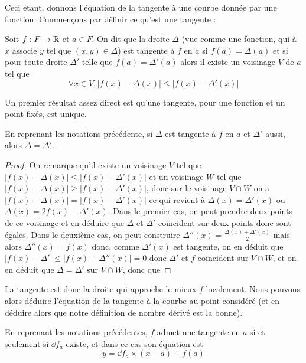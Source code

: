  Ceci étant, donnons l'équation de la tangente à une courbe donnée par une fonction. Commençons par définir ce qu'est une tangente :

 \begin{defi}
     Soit $f : F \to \mathbb{R}$ et $a\in F$. On dit que la droite $\Delta$ (vue comme une fonction, qui à $x$ associe $y$ tel que $(x,y)\in \Delta$) est tangente à $f$ en $a$ si $f(a)=\Delta(a)$ et si pour toute droite $\Delta'$ telle que $f(a)=\Delta'(a)$ alors il existe un voisinage $V$ de $a$ tel que $$\forall x\in V, |f(x)-\Delta(x)| \leq |f(x)-\Delta'(x)|$$
 \end{defi}

 Un premier résultat assez direct est qu'une tangente, pour une fonction et un point fixés, est unique.

 \begin{prop}
     En reprenant les notations précédente, si $\Delta$ est tangente à $f$ en $a$ et $\Delta'$ aussi, alors $\Delta = \Delta'$.
 \end{prop}

 \begin{proof}
     On remarque qu'il existe un voisinage $V$ tel que $|f(x)-\Delta(x)| \leq |f(x)-\Delta'(x)|$ et un voisinage $W$ tel que $|f(x)-\Delta(x)| \geq |f(x)-\Delta'(x)|$, donc sur le voisinage $V\cap W$ on a $|f(x) -\Delta(x)| = |f(x)-\Delta'(x)|$ ce qui revient à $\Delta(x) = \Delta'(x)$ ou $\Delta(x) = 2f(x)-\Delta'(x)$. Dans le premier cas, on peut prendre deux points de ce voisinage et en déduire que $\Delta$ et $\Delta'$ coïncident sur deux points donc sont égales. Dans le deuxième cas, on peut construire $\Delta''(x) = \displaystyle{\frac{\Delta(x)+\Delta'(x)}{2}}$ mais alors $\Delta''(x) = f(x)$ donc, comme $\Delta'(x)$ est tangente, on en déduit que $|f(x)-\Delta'| \leq |f(x)-\Delta''(x)|=0$ donc $\Delta'$ et $f$ coïncident sur $V\cap W$, et on en déduit que $\Delta = \Delta'$ sur $V\cap W$, donc que 
 \end{proof}

 La tangente est donc la droite qui approche le mieux $f$ localement. Nous pouvons alors déduire l'équation de la tangente à la courbe au point considéré (et en déduire alors que notre définition de nombre dérivé est la bonne).

 \begin{prop}
    En reprenant les notations précédentes, $f$ admet une tangente en $a$ si et seulement si $\dd f_a$ existe, et dans ce cas son équation est $$y = \dd f_a\times (x-a) + f(a)$$
 \end{prop}

